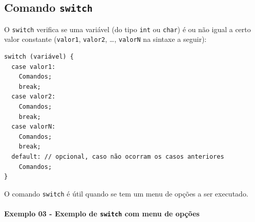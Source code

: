 \documentclass[12pt,a4paper]{article}
\begin{document}
    \hypertarget{comando-switch}{%
\subsection{\texorpdfstring{Comando
\texttt{switch}}{Comando switch}}\label{comando-switch}}

    O \texttt{switch} verifica se uma variável (do tipo \texttt{int} ou
\texttt{char}) é ou não igual a certo valor constante (\texttt{valor1},
\texttt{valor2}, \ldots{}, \texttt{valorN} na sintaxe a seguir):

\begin{verbatim}
switch (variável) {
  case valor1:
    Comandos;
    break;
  case valor2:
    Comandos;
    break;
  case valorN:
    Comandos;
    break;
  default: // opcional, caso não ocorram os casos anteriores
    Comandos;
}
\end{verbatim}

O comando \texttt{switch} é útil quando se tem um menu de opções a ser
executado.

    \hypertarget{exemplo-03---exemplo-de-switch-com-menu-de-opuxe7uxf5es}{%
\paragraph{\texorpdfstring{Exemplo 03 - Exemplo de \texttt{switch} com
menu de
opções}{Exemplo 03 - Exemplo de switch com menu de opções}}\label{exemplo-03---exemplo-de-switch-com-menu-de-opuxe7uxf5es}}
\end{document}

